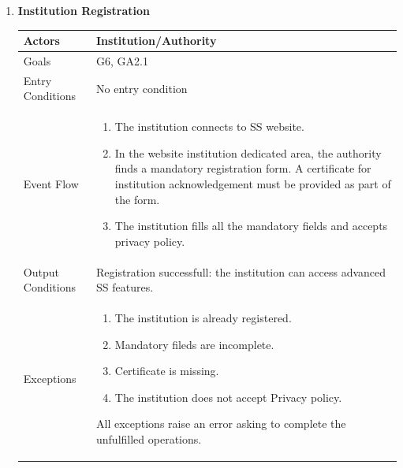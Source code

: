 \begin{enumerate}
	\clearpage
	
	\item \textbf{Institution Registration}
		\begin{table}[h!]
		\begin{tabular}{|l|p{}|}
		\hline
		Actors            			&       	Institution/Authority\\ \hline
		Goals             			&         	G6, GA2.1\\ \hline
		Entry Conditions  	&  		No entry condition\\ \hline
		Event Flow        		&          
				\begin{enumerate}[label=\alph*)]
					\item The institution connects to SS website.
					\item In the website institution dedicated area, the authority finds a mandatory registration form. A certificate for institution acknowledgement must be provided as part of the form.
					\item The institution fills all the mandatory fields and accepts privacy policy.
					\end{enumerate}\\ \hline
		Output Conditions &    		Registration successfull: the institution can access advanced SS features.\\ \hline
		Exceptions        		&
				\begin{enumerate}[label=\alph*)]
					\item The institution is already registered.
					\item Mandatory fileds are incomplete.
					\item Certificate is missing.
					\item The institution does not accept Privacy policy.
				\end{enumerate}
				All exceptions raise an error asking to complete the unfulfilled operations. \\ \hline
	\end{tabular}
	\end{table}
	

\end{enumerate}
